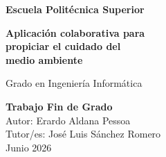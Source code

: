 
\begin{titlepage}
\begin{center}

\noindent\colorbox{uablue}{%
  \parbox{\dimexpr\textwidth-2\fboxsep}{%
    \vspace{0.5cm}
    \hfill{\color{white}\sffamily\large\bfseries Escuela Politécnica Superior}
    \vspace{0.5cm}
  }%
}

\vspace{3cm}

{\sffamily\fontsize{28pt}{34pt}\selectfont\bfseries
Aplicación colaborativa para\\[0.3cm]
propiciar el cuidado del\\[0.3cm]
medio ambiente}

\vspace{1cm}

{\sffamily\LARGE Grado en Ingeniería Informática}

\vfill

\noindent\colorbox{gray!80}{%
  \parbox{\dimexpr\textwidth-2\fboxsep}{%
    \vspace{0.5cm}
    \color{white}\sffamily
    {\Large\bfseries Trabajo Fin de Grado}\\[0.4cm]
    {\normalsize Autor: Erardo Aldana Pessoa}\\[0.2cm]
    {\normalsize Tutor/es: José Luis Sánchez Romero}\\[0.4cm]
    {\normalsize Junio 2026}
    \vspace{0.3cm}
    \hfill
    \vspace{0.3cm}
  }%
}

\end{center}
\end{titlepage}
